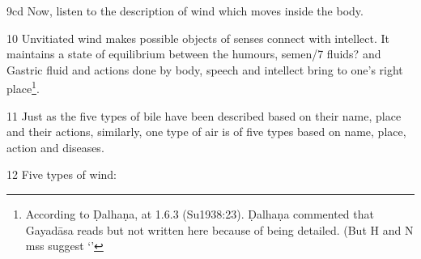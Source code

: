 \begin{translation}
                    \item[9cd] Now, listen to the description of wind which moves inside 
                    the 
                    body.
                    
                    \item[10] Unvitiated wind makes possible objects of senses connect 
                    with
                    intellect. It maintains a state of equilibrium between the humours,
                    semen/7 fluids? and Gastric fluid and actions done by body, speech 
                    and
                    intellect bring to one's right place\footnote{ According to Ḍalhaṇa,
                        at 1.6.3 (Su1938:23). Ḍalhaṇa 
                        commented that 
                        Gayadāsa
                        reads but not written here because 
                        of being
                        detailed. (But H and N mss suggest 
                        `'}.
                        
                        \item[11] Just as the five types of bile have been described based 
                        on their
                        name, place and their actions, similarly, one type of air is of five
                        types based on name, place, action and diseases.
                        
                        \item[12] Five types of wind:
                        

\end{translation}
